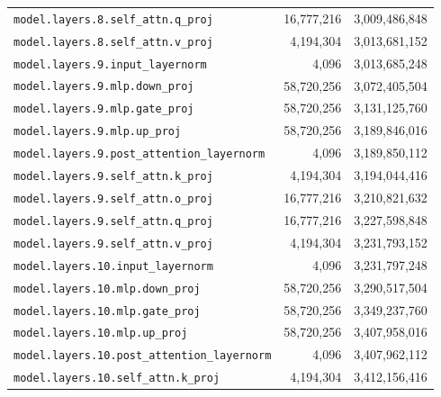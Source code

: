 \documentclass[10pt,a4paper]{article}
\theoremstyle{definition}
\begin{document}
\begin{appendices}
\begin{longtable}{p{9.5cm}rr}
\texttt{model.\allowbreak{}layers.\allowbreak{}8.\allowbreak{}self\_attn.\allowbreak{}q\_proj} & 16,777,216 & 3,009,486,848 \\
\texttt{model.\allowbreak{}layers.\allowbreak{}8.\allowbreak{}self\_attn.\allowbreak{}v\_proj} & 4,194,304 & 3,013,681,152 \\
\texttt{model.\allowbreak{}layers.\allowbreak{}9.\allowbreak{}input\_layernorm} & 4,096 & 3,013,685,248 \\
\texttt{model.\allowbreak{}layers.\allowbreak{}9.\allowbreak{}mlp.\allowbreak{}down\_proj} & 58,720,256 & 3,072,405,504 \\
\texttt{model.\allowbreak{}layers.\allowbreak{}9.\allowbreak{}mlp.\allowbreak{}gate\_proj} & 58,720,256 & 3,131,125,760 \\
\texttt{model.\allowbreak{}layers.\allowbreak{}9.\allowbreak{}mlp.\allowbreak{}up\_proj} & 58,720,256 & 3,189,846,016 \\
\texttt{model.\allowbreak{}layers.\allowbreak{}9.\allowbreak{}post\_attention\_layernorm} & 4,096 & 3,189,850,112 \\
\texttt{model.\allowbreak{}layers.\allowbreak{}9.\allowbreak{}self\_attn.\allowbreak{}k\_proj} & 4,194,304 & 3,194,044,416 \\
\texttt{model.\allowbreak{}layers.\allowbreak{}9.\allowbreak{}self\_attn.\allowbreak{}o\_proj} & 16,777,216 & 3,210,821,632 \\
\texttt{model.\allowbreak{}layers.\allowbreak{}9.\allowbreak{}self\_attn.\allowbreak{}q\_proj} & 16,777,216 & 3,227,598,848 \\
\texttt{model.\allowbreak{}layers.\allowbreak{}9.\allowbreak{}self\_attn.\allowbreak{}v\_proj} & 4,194,304 & 3,231,793,152 \\
\texttt{model.\allowbreak{}layers.\allowbreak{}10.\allowbreak{}input\_layernorm} & 4,096 & 3,231,797,248 \\
\texttt{model.\allowbreak{}layers.\allowbreak{}10.\allowbreak{}mlp.\allowbreak{}down\_proj} & 58,720,256 & 3,290,517,504 \\
\texttt{model.\allowbreak{}layers.\allowbreak{}10.\allowbreak{}mlp.\allowbreak{}gate\_proj} & 58,720,256 & 3,349,237,760 \\
\texttt{model.\allowbreak{}layers.\allowbreak{}10.\allowbreak{}mlp.\allowbreak{}up\_proj} & 58,720,256 & 3,407,958,016 \\
\texttt{model.\allowbreak{}layers.\allowbreak{}10.\allowbreak{}post\_attention\_layernorm} & 4,096 & 3,407,962,112 \\
\texttt{model.\allowbreak{}layers.\allowbreak{}10.\allowbreak{}self\_attn.\allowbreak{}k\_proj} & 4,194,304 & 3,412,156,416 \\

\end{longtable}
\end{appendices}
\end{document}
